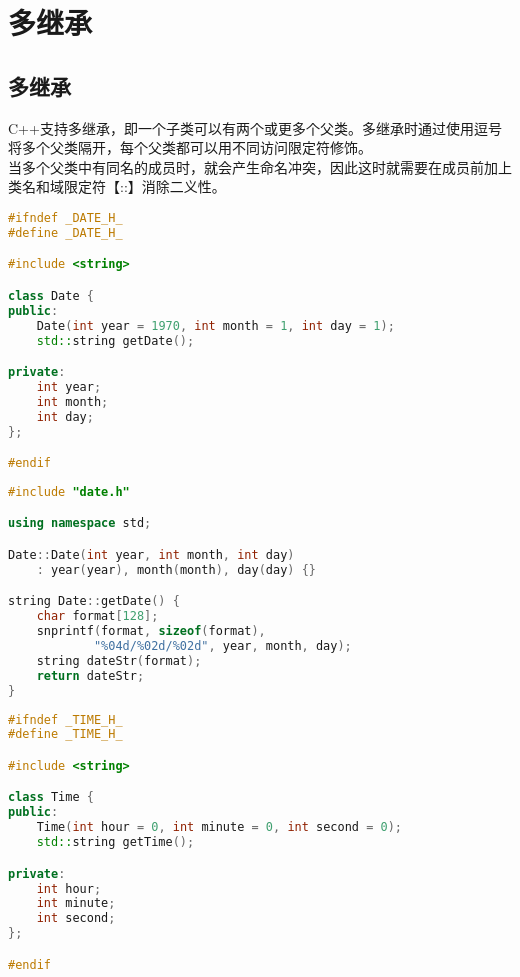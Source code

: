 \newpage

\section{多继承}

\subsection{多继承}

C++支持多继承，即一个子类可以有两个或更多个父类。多继承时通过使用逗号将多个父类隔开，每个父类都可以用不同访问限定符修饰。\\

当多个父类中有同名的成员时，就会产生命名冲突，因此这时就需要在成员前加上类名和域限定符【::】消除二义性。\\


\begin{lstlisting}[language=C++, title=date.h]
#ifndef _DATE_H_
#define _DATE_H_

#include <string>

class Date {
public:
    Date(int year = 1970, int month = 1, int day = 1);
    std::string getDate();

private:
    int year;
    int month;
    int day;
};

#endif
\end{lstlisting}

\begin{lstlisting}[language=C++, title=date.cpp]
#include "date.h"

using namespace std;

Date::Date(int year, int month, int day)
    : year(year), month(month), day(day) {}

string Date::getDate() {
    char format[128];
    snprintf(format, sizeof(format), 
            "%04d/%02d/%02d", year, month, day);
    string dateStr(format);
    return dateStr;
}
\end{lstlisting}

\begin{lstlisting}[language=C++, title=time.h]
#ifndef _TIME_H_
#define _TIME_H_

#include <string>

class Time {
public:
    Time(int hour = 0, int minute = 0, int second = 0);
    std::string getTime();

private:
    int hour;
    int minute;
    int second;
};

#endif
\end{lstlisting}

